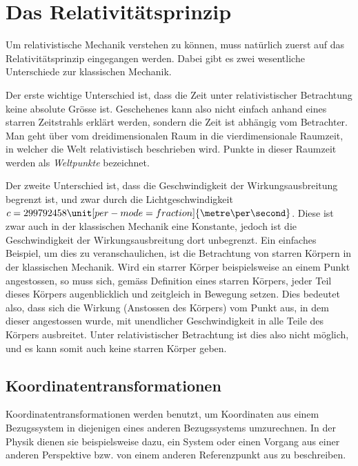 
\section{Das Relativitätsprinzip 
\label{relativ:section:relativistik}}

Um relativistische Mechanik verstehen zu können,
muss natürlich zuerst auf das Relativitätsprinzip eingegangen werden.
Dabei gibt es zwei wesentliche Unterschiede zur klassischen Mechanik.

Der erste wichtige Unterschied ist, dass die Zeit unter relativistischer Betrachtung keine absolute Grösse ist.
Geschehenes kann also nicht einfach anhand eines starren Zeitstrahls erklärt werden, sondern die Zeit ist abhängig vom Betrachter.
Man geht über vom dreidimensionalen Raum in die vierdimensionale Raumzeit, in welcher die Welt relativistisch beschrieben wird.
Punkte in dieser Raumzeit werden als \emph{Weltpunkte} bezeichnet.

Der zweite Unterschied ist,
dass die Geschwindigkeit der Wirkungsausbreitung begrenzt ist,
und zwar durch die Lichtgeschwindigkeit
\(c=299792458\unit[per-mode = fraction]{\metre\per\second}\).
Diese ist zwar auch in der klassischen Mechanik eine Konstante,
jedoch ist die Geschwindigkeit der Wirkungsausbreitung dort unbegrenzt.
Ein einfaches Beispiel, um dies zu veranschaulichen,
ist die Betrachtung von starren Körpern in der klassischen Mechanik.
Wird ein starrer Körper beispielsweise an einem Punkt angestossen,
so muss sich, gemäss Definition eines starren Körpers,
jeder Teil dieses Körpers augenblicklich und zeitgleich in Bewegung setzen.
Dies bedeutet also, dass sich die Wirkung (Anstossen des Körpers)
vom Punkt aus, in dem dieser angestossen wurde,
mit unendlicher Geschwindigkeit in alle Teile des Körpers ausbreitet.
Unter relativistischer Betrachtung ist dies also nicht möglich,
und es kann somit auch keine starren Körper geben.


\subsection{Koordinatentransformationen 
\label{relativ:section:koordtrafo}}

Koordinatentransformationen werden benutzt,
um Koordinaten aus einem Bezugssystem in diejenigen eines anderen Bezugssystems umzurechnen.
In der Physik dienen sie beispielsweise dazu,
ein System oder einen Vorgang aus einer anderen Perspektive bzw.
von einem anderen Referenzpunkt aus zu beschreiben.

